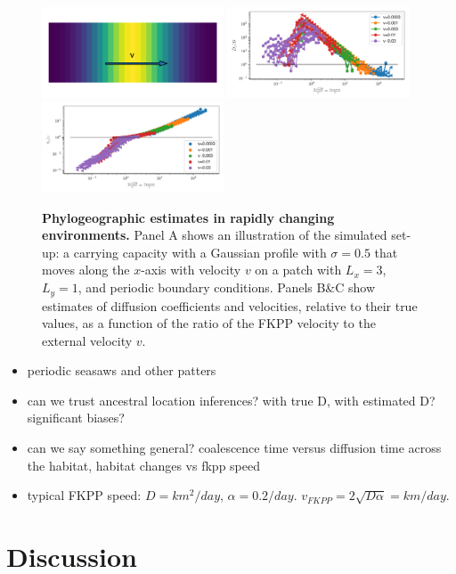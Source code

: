 \documentclass[aps,rmp, twocolumn]{revtex4}
\begin{document}
\begin{figure}
    \includegraphics[width=0.48\textwidth]{figures/traveling_wave}
    \includegraphics[width=0.48\textwidth]{figures/waves_D}
    \includegraphics[width=0.48\textwidth]{figures/waves_v}
    \caption{\label{fig:traveling_wave} {\bf Phylogeographic estimates in rapidly changing environments.} Panel A shows an illustration of the simulated set-up: a carrying capacity with a Gaussian profile with $\sigma=0.5$ that moves along the $x$-axis with velocity $v$ on a patch with $L_x=3$, $L_y=1$, and periodic boundary conditions.
    Panels B\&C show estimates of diffusion coefficients and velocities, relative to their true values, as a function of the ratio of the FKPP velocity to the external velocity $v$. }
\end{figure}

\begin{itemize}
    \item periodic seasaws and other patters
    \item can we trust ancestral location inferences? with true D, with estimated D? significant biases?
    \item can we say something general? coalescence time versus diffusion time across the habitat, habitat changes vs fkpp speed
    \item typical FKPP speed: $D=km^2/day$, $\alpha = 0.2/day$. $v_{FKPP} = 2\sqrt{D\alpha} = km/day$.
\end{itemize} 

\section*{Discussion}



\end{document}
